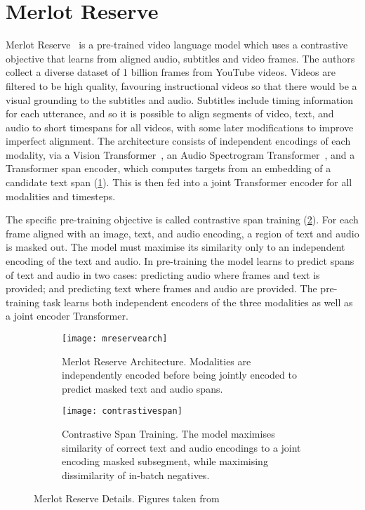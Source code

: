 \section{Merlot Reserve}
\label{sec:mreserve}

Merlot Reserve~\citep{zellers2022mreserve} is a pre-trained video language
model which uses a contrastive objective that learns from aligned audio,
subtitles and video frames. The authors collect a diverse dataset of 1 billion
frames from YouTube videos. Videos are filtered to be high quality, favouring
instructional videos so that there would be a visual grounding to the subtitles
and audio. Subtitles include timing information for each utterance, and so it
is possible to align segments of video, text, and audio to short timespans for
all videos, with some later modifications to improve imperfect alignment. The
architecture consists of independent encodings of each modality, via a Vision
Transformer~\citep{dosovitskiy2021vit}, an Audio Spectrogram
Transformer~\citep{gong2021ast}, and a Transformer span encoder, which computes
targets from an embedding of a candidate text span (\cref{fig:mreservearch}).
This is then fed into a joint Transformer encoder for all modalities and
timesteps.

The specific pre-training objective is called contrastive span training
(\cref{fig:contrastivespan}). For each frame aligned with an image, text, and
audio encoding, a region of text and audio is masked out. The model must
maximise its similarity only to an independent encoding of the text and audio.
In pre-training the model learns to predict spans of text and audio in two
cases: predicting audio where frames and text is provided; and predicting text
where frames and audio are provided. The pre-training task learns both
independent encoders of the three modalities as well as a joint encoder
Transformer.

\begin{figure}[tp]
	\centering
	\begin{subfigure}[b]{0.45\textwidth}
		\centering
		\texttt{[image: mreservearch]}
		\caption{Merlot Reserve Architecture. Modalities are independently
		encoded before being jointly encoded to predict masked text and audio
		spans.}
		\label{fig:mreservearch}
	\end{subfigure}
	\hfill
	\begin{subfigure}[b]{0.45\textwidth}
		\centering
		\texttt{[image: contrastivespan]}
		\caption{Contrastive Span Training. The model maximises similarity of
		correct text and audio encodings to a joint encoding masked subsegment,
		while maximising dissimilarity of in-batch negatives.}
		\label{fig:contrastivespan}
	\end{subfigure}
	\caption{Merlot Reserve Details. Figures taken from~\citet{zellers2022mreserve}}
	\label{fig:mreserve}
\end{figure}

